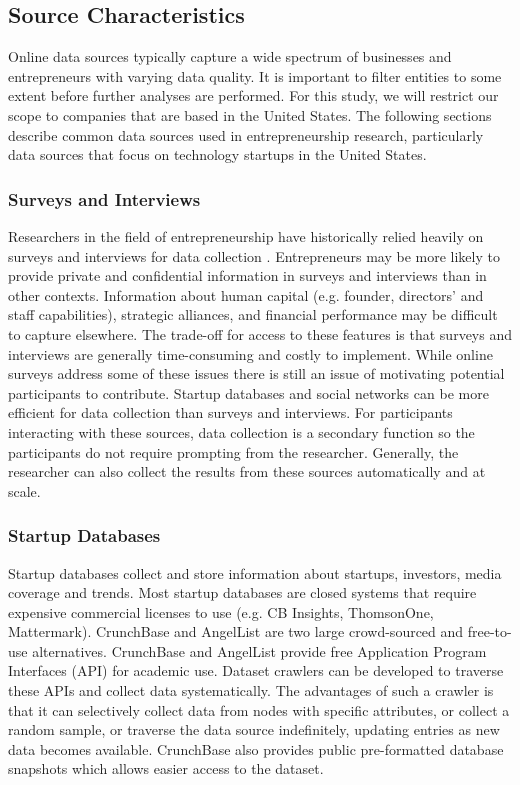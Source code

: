 \documentclass[../thesis/thesis.tex]{subfiles}
\begin{document}
\subsection{Source Characteristics}

Online data sources typically capture a wide spectrum of businesses and entrepreneurs with varying data quality. It is important to filter entities to some extent before further analyses are performed. For this study, we will restrict our scope to companies that are based in the United States. The following sections describe common data sources used in entrepreneurship research, particularly data sources that focus on technology startups in the United States.

\subsubsection{Surveys and Interviews}

Researchers in the field of entrepreneurship have historically relied heavily on surveys and interviews for data collection \cite{CITE}. Entrepreneurs may be more likely to provide private and confidential information in surveys and interviews than in other contexts. Information about human capital (e.g. founder, directors' and staff capabilities), strategic alliances, and financial performance may be difficult to capture elsewhere. The trade-off for access to these features is that surveys and interviews are generally time-consuming and costly to implement. While online surveys address some of these issues there is still an issue of motivating potential participants to contribute. Startup databases and social networks can be more efficient for data collection than surveys and interviews. For participants interacting with these sources, data collection is a secondary function so the participants do not require prompting from the researcher. Generally, the researcher can also collect the results from these sources automatically and at scale.

\subsubsection{Startup Databases}

Startup databases collect and store information about startups, investors, media coverage and trends. Most startup databases are closed systems that require expensive commercial licenses to use (e.g. CB Insights, ThomsonOne, Mattermark). CrunchBase and AngelList are two large crowd-sourced and free-to-use alternatives. CrunchBase and AngelList provide free Application Program Interfaces (API) for academic use. Dataset crawlers can be developed to traverse these APIs and collect data systematically. The advantages of such a crawler is that it can selectively collect data from nodes with specific attributes, or collect a random sample, or traverse the data source indefinitely, updating entries as new data becomes available. CrunchBase also provides public pre-formatted database snapshots which allows easier access to the dataset.
\end{document}
